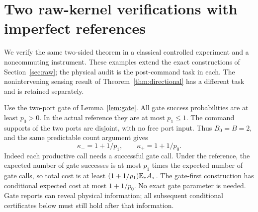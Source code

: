 \section{Two raw-kernel verifications with imperfect references}
\label{sec:calibrated-realizations}
We verify the same two-sided theorem in a classical controlled experiment and a noncommuting instrument. These examples extend the exact constructions of Section~\ref{sec:raw}; the physical audit is the post-command task in each. The nonintervening sensing result of Theorem~\ref{thm:directional} has a different task and is retained separately.

Use the two-port gate of Lemma~\ref{lem:gate}. All gate success probabilities are at least $p_0>0$. In the actual reference they are at most $p_1\le1$. The command supports of the two ports are disjoint, with no free port input. Thus $B_0=B=2$, and the same predictable count argument gives
\begin{equation}\label{eq:imperfect-gate}
 \kappa_-=1+1/p_1,\qquad \kappa_+=1+1/p_0.
\end{equation}
Indeed each productive call needs a successful gate call. Under the reference, the expected number of gate successes is at most $p_1$ times the expected number of gate calls, so total cost is at least $(1+1/p_1)\mathbb E_*A_\tau$. The gate-first construction has conditional expected cost at most $1+1/p_0$. No exact gate parameter is needed. Gate reports can reveal physical information; all subsequent conditional certificates below must still hold after that information.

